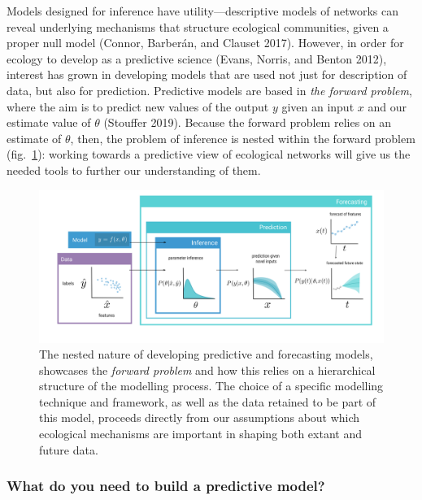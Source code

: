 \documentclass[10pt,oneside]{article}
\makeatletter
\def\maxwidth{\ifdim\Gin@nat@width>\linewidth\linewidth
\else\Gin@nat@width\fi}
\let\Oldincludegraphics\includegraphics
\renewcommand{\includegraphics}[1]{\Oldincludegraphics[width=\maxwidth]{#1}}
\makeatother
\begin{document}
Models designed for inference have utility---descriptive models of
networks can reveal underlying mechanisms that structure ecological
communities, given a proper null model (Connor, Barberán, and Clauset
2017). However, in order for ecology to develop as a predictive science
(Evans, Norris, and Benton 2012), interest has grown in developing
models that are used not just for description of data, but also for
prediction. Predictive models are based in \emph{the forward problem},
where the aim is to predict new values of the output \(y\) given an
input \(x\) and our estimate value of \(\theta\) (Stouffer 2019).
Because the forward problem relies on an estimate of \(\theta\), then,
the problem of inference is nested within the forward problem
(fig.~\ref{fig:models}): working towards a predictive view of ecological
networks will give us the needed tools to further our understanding of
them.

\begin{figure}
\hypertarget{fig:models}{%
\centering
\includegraphics{figures/forecasting_v4.png}
\caption{The nested nature of developing predictive and forecasting
models, showcases the \emph{forward problem} and how this relies on a
hierarchical structure of the modelling process. The choice of a
specific modelling technique and framework, as well as the data retained
to be part of this model, proceeds directly from our assumptions about
which ecological mechanisms are important in shaping both extant and
future data.}\label{fig:models}
}
\end{figure}

\hypertarget{what-do-you-need-to-build-a-predictive-model}{%
\subsubsection{What do you need to build a predictive
model?}\label{what-do-you-need-to-build-a-predictive-model}}
\end{document}
